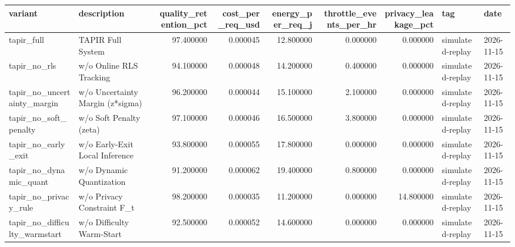 \begin{tabular}{llrrrrrll}
\toprule
variant & description & quality_retention_pct & cost_per_req_usd & energy_per_req_j & throttle_events_per_hr & privacy_leakage_pct & tag & date \\
\midrule
tapir_full & TAPIR Full System & 97.400000 & 0.000045 & 12.800000 & 0.000000 & 0.000000 & simulated-replay & 2026-11-15 \\
tapir_no_rls & w/o Online RLS Tracking & 94.100000 & 0.000048 & 14.200000 & 0.400000 & 0.000000 & simulated-replay & 2026-11-15 \\
tapir_no_uncertainty_margin & w/o Uncertainty Margin (z*sigma) & 96.200000 & 0.000044 & 15.100000 & 2.100000 & 0.000000 & simulated-replay & 2026-11-15 \\
tapir_no_soft_penalty & w/o Soft Penalty (zeta) & 97.100000 & 0.000046 & 16.500000 & 3.800000 & 0.000000 & simulated-replay & 2026-11-15 \\
tapir_no_early_exit & w/o Early-Exit Local Inference & 93.800000 & 0.000055 & 17.800000 & 0.000000 & 0.000000 & simulated-replay & 2026-11-15 \\
tapir_no_dynamic_quant & w/o Dynamic Quantization & 91.200000 & 0.000062 & 19.400000 & 0.800000 & 0.000000 & simulated-replay & 2026-11-15 \\
tapir_no_privacy_rule & w/o Privacy Constraint F_t & 98.200000 & 0.000035 & 11.200000 & 0.000000 & 14.800000 & simulated-replay & 2026-11-15 \\
tapir_no_difficulty_warmstart & w/o Difficulty Warm-Start & 92.500000 & 0.000052 & 14.600000 & 0.000000 & 0.000000 & simulated-replay & 2026-11-15 \\
\bottomrule
\end{tabular}
